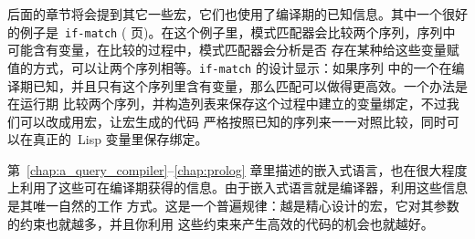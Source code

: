 后面的章节将会提到其它一些宏，它们也使用了编译期的已知信息。其中一个很好的例子是~\verb|if-match|
(\pageref{macro:if-match} 页)。在这个例子里，模式匹配器会比较两个序列，序列中可能含有变量，在比较的过程中，模式匹配器会分析是否
存在某种给这些变量赋值的方式，可以让两个序列相等。\verb|if-match| 的设计显示：如果序列
中的一个在编译期已知，并且只有这个序列里含有变量，那么匹配可以做得更高效。一个办法是在运行期
比较两个序列，并构造列表来保存这个过程中建立的变量绑定，不过我们可以改成用宏，让宏生成的代码
严格按照已知的序列来一一对照比较，同时可以在真正的~Lisp 变量里保存绑定。

第~\ref{chap:a_query_compiler}--\ref{chap:prolog} 章里描述的嵌入式语言，也在很大程度
上利用了这些可在编译期获得的信息。由于嵌入式语言就是编译器，利用这些信息是其唯一自然的工作
方式。这是一个普遍规律：越是精心设计的宏，它对其参数的约束也就越多，并且你利用
这些约束来产生高效的代码的机会也就越好。

